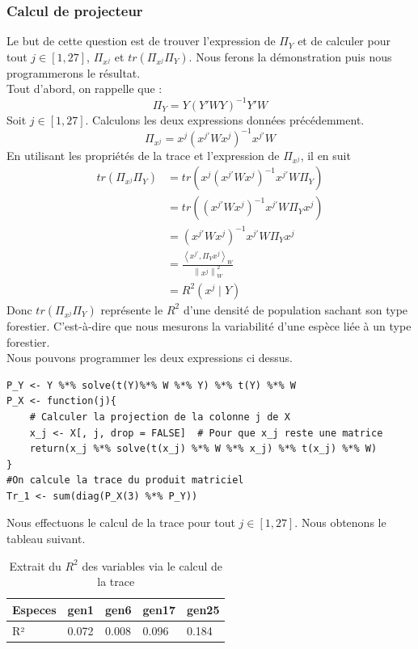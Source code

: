 \documentclass{article}
\begin{document}
\subsubsection{Calcul de projecteur}
Le but de cette question est de trouver l'expression
de $\Pi_Y$ et de calculer pour tout $j \in [1,27]$, $\Pi_{x^{j}}$ et $tr(\Pi_{x^{j}}\Pi_Y)$. Nous ferons la démonstration
puis nous programmerons le résultat. \\
Tout d'abord, on rappelle que :
\[
\Pi_Y = Y(Y'WY)^{-1}Y'W
\]
Soit $j \in [1,27]$. Calculons les deux expressions données précédemment.
\[
\Pi_{x^j}= x^{j}(x^{j\prime}Wx^{j})^{-1}x^{j\prime}W
\]
En utilisant les propriétés de la trace et l'expression de $\Pi_{x^j}$, il en suit 
\begin{align*}
    tr(\Pi_{x^{j}}\Pi_Y) &= tr(x^{j}(x^{j\prime}Wx^{j})^{-1}x^{j\prime}W\Pi_Y) \\
    &=tr((x^{j\prime}Wx^{j})^{-1}x^{j\prime}W\Pi_Yx^{j})\\
    &=(x^{j\prime}Wx^{j})^{-1}x^{j\prime}W\Pi_Yx^{j}\\
    &= \frac{\left\langle x^{j\prime},\Pi_Yx^{j}\right\rangle_W }{\left\lVert x^j\right\rVert^2_W }\\
    &= R^2(x^j\mid Y )
\end{align*}
Donc $tr(\Pi_{x^{j}}\Pi_Y)$ représente le $R^2$ d'une densité de population sachant son type forestier. C'est-à-dire que nous 
mesurons la variabilité d'une espèce liée à un type forestier. \\
Nous pouvons programmer les deux expressions ci dessus. \\
\begin{lstlisting}[caption=Extrait du code R, label= Question 1b]
P_Y <- Y %*% solve(t(Y)%*% W %*% Y) %*% t(Y) %*% W
P_X <- function(j){
    # Calculer la projection de la colonne j de X
    x_j <- X[, j, drop = FALSE]  # Pour que x_j reste une matrice
    return(x_j %*% solve(t(x_j) %*% W %*% x_j) %*% t(x_j) %*% W)
}
#On calcule la trace du produit matriciel
Tr_1 <- sum(diag(P_X(3) %*% P_Y))
\end{lstlisting}
Nous effectuons le calcul de la trace pour tout $j \in [1,27]$. Nous obtenons le tableau suivant. 
\begin{table}[H]
    \centering
    \caption{Extrait du $R^2$ des variables via le calcul de la trace}
    \label{tab:statistiques 1.b}
    \begin{tabular}{|l|l|l|l|l|}
    \hline
    Especes & gen1  & gen6  & gen17 & gen25 \\ \hline
    R²      & 0.072 & 0.008 & 0.096 & 0.184 \\ \hline
    \end{tabular}
    \centering
\end{table}
\end{document}
